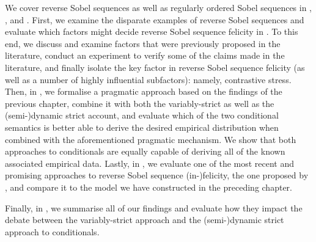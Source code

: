We cover reverse Sobel sequences as well as regularly ordered Sobel sequences in , , and . First, we examine the disparate examples of reverse Sobel sequences and evaluate which factors might decide reverse Sobel sequence felicity in . To this end, we discuss and examine factors that were previously proposed in the literature, conduct an experiment to verify some of the claims made in the literature, and finally isolate the key factor in reverse Sobel sequence felicity (as well as a number of highly influential subfactors): namely, contrastive stress. Then, in , we formalise a pragmatic approach based on the findings of the previous chapter, combine it with both the variably-strict as well as the (semi-)dynamic strict account, and evaluate which of the two conditional semantics is better able to derive the desired empirical distribution when combined with the aforementioned pragmatic mechanism. We show that both approaches to conditionals are equally capable of deriving all of the known associated empirical data. Lastly, in , we evaluate one of the most recent and promising approaches to reverse Sobel sequence (in-)felicity, the one proposed by \textcite{Ippolito2020}, and compare it to the model we have constructed in the preceding chapter.

Finally, in , we summarise all of our findings and evaluate how they impact the debate between the variably-strict approach and the (semi-)dynamic strict approach to conditionals.
